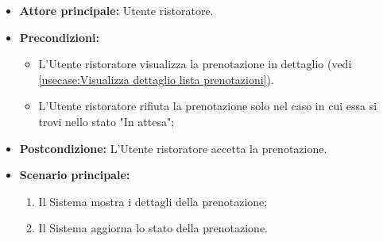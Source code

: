 \label{usecase:Accetta prenotazione}
\begin{itemize}
	\item \textbf{Attore principale:} Utente ristoratore.

	\item \textbf{Precondizioni:} 
	\begin{itemize}
		\item L'Utente ristoratore visualizza la prenotazione in dettaglio (vedi \autoref{usecase:Visualizza dettaglio lista prenotazioni}).
		\item L'Utente ristoratore rifiuta la prenotazione solo nel caso in cui essa si trovi nello stato "In attesa";
	\end{itemize}

	\item \textbf{Postcondizione:} L'Utente ristoratore accetta la prenotazione.


	\item \textbf{Scenario principale:}
	      \begin{enumerate}
		      \item Il Sistema mostra i dettagli della prenotazione;
		      \item Il Sistema aggiorna lo stato della prenotazione.

	      \end{enumerate}
\end{itemize}

